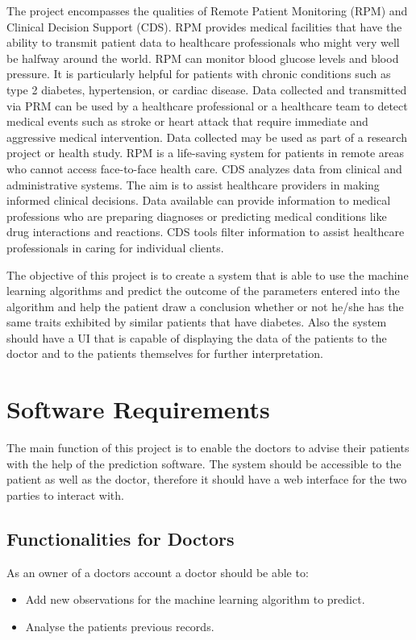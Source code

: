 \documentclass[12pt]{article}
\begin{document}
The project encompasses the qualities of Remote Patient Monitoring (RPM) and Clinical Decision Support (CDS). RPM provides medical facilities that have the ability to transmit patient data to healthcare professionals who might very well be halfway around the world. RPM can monitor blood glucose levels and blood pressure. It is particularly helpful for patients with chronic conditions such as type 2 diabetes, hypertension, or cardiac disease. Data collected and transmitted via PRM can be used by a healthcare professional or a healthcare team to detect medical events such as stroke or heart attack that require immediate and aggressive medical intervention. Data collected may be used as part of a research project or health study. RPM is a life-saving system for patients in remote areas who cannot access face-to-face health care. CDS analyzes data from clinical and administrative systems. The aim is to assist healthcare providers in making informed clinical decisions. Data available can provide information to medical professions who are preparing diagnoses or predicting medical conditions like drug interactions and reactions. CDS tools filter information to assist healthcare professionals in caring for individual clients. 

The objective of this project is to create a  system that is able to use the machine learning algorithms and predict the outcome of the parameters entered into the algorithm and help the patient draw a conclusion whether or not he/she has the same traits exhibited by similar patients that have diabetes. Also the system should have a UI that is capable of displaying the data of the patients to the doctor and to the patients themselves for further interpretation.

\newpage
\section{Software Requirements}
The main function of this project is to enable the doctors to advise their patients with the help of the prediction software. The system should be accessible to the patient as well as the doctor, therefore it should have a web interface for the two parties to interact with.

\subsection{Functionalities for Doctors}
As an owner of a doctors account a doctor should be able to:
\begin{itemize}
\item Add new observations for the machine learning algorithm to predict.
\item Analyse the patients previous records.
\end{itemize}
\end{document}
